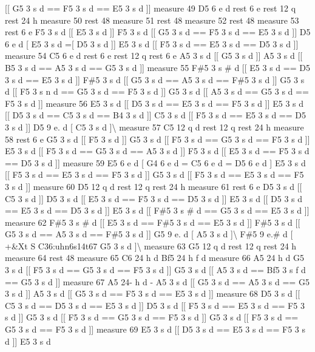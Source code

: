 \mbox{[}\mbox{[} G5 3 s d == F5 3 s d == E5 3 s d \mbox{]}\mbox{]} measure 49 D5 6 e d rest 6 e rest 12 q rest 24 h measure 50 rest 48 measure 51 rest 48 measure 52 rest 48 measure 53 rest 6 e F5 3 s d \mbox{[}\mbox{[} E5 3 s d \mbox{]}\mbox{]} F5 3 s d \mbox{[}\mbox{[} G5 3 s d == F5 3 s d == E5 3 s d \mbox{]}\mbox{]} D5 6 e d \mbox{[} E5 3 s d =\mbox{[} D5 3 s d \mbox{]}\mbox{]} E5 3 s d \mbox{[}\mbox{[} F5 3 s d == E5 3 s d == D5 3 s d \mbox{]}\mbox{]} measure 54 C5 6 e d rest 6 e rest 12 q rest 6 e A5 3 s d \mbox{[}\mbox{[} G5 3 s d \mbox{]}\mbox{]} A5 3 s d \mbox{[}\mbox{[} B5 3 s d == A5 3 s d == G5 3 s d \mbox{]}\mbox{]} measure 55 F\#5 3 s \# d \mbox{[}\mbox{[} E5 3 s d == D5 3 s d == E5 3 s d \mbox{]}\mbox{]} F\#5 3 s d \mbox{[}\mbox{[} G5 3 s d == A5 3 s d == F\#5 3 s d \mbox{]}\mbox{]} G5 3 s d \mbox{[}\mbox{[} F5 3 s n d == G5 3 s d == F5 3 s d \mbox{]}\mbox{]} G5 3 s d \mbox{[}\mbox{[} A5 3 s d == G5 3 s d == F5 3 s d \mbox{]}\mbox{]} measure 56 E5 3 s d \mbox{[}\mbox{[} D5 3 s d == E5 3 s d == F5 3 s d \mbox{]}\mbox{]} E5 3 s d \mbox{[}\mbox{[} D5 3 s d == C5 3 s d == B4 3 s d \mbox{]}\mbox{]} C5 3 s d \mbox{[}\mbox{[} F5 3 s d == E5 3 s d == D5 3 s d \mbox{]}\mbox{]} D5 9 e. d \mbox{[} C5 3 s d \mbox{]}\textbackslash{} measure 57 C5 12 q d rest 12 q rest 24 h measure 58 rest 6 e G5 3 s d \mbox{[}\mbox{[} F5 3 s d \mbox{]}\mbox{]} G5 3 s d \mbox{[}\mbox{[} F5 3 s d == G5 3 s d == F5 3 s d \mbox{]}\mbox{]} E5 3 s d \mbox{[}\mbox{[} F5 3 s d == G5 3 s d == A5 3 s d \mbox{]}\mbox{]} F5 3 s d \mbox{[}\mbox{[} E5 3 s d == F5 3 s d == D5 3 s d \mbox{]}\mbox{]} measure 59 E5 6 e d \mbox{[} G4 6 e d = C5 6 e d = D5 6 e d \mbox{]} E5 3 s d \mbox{[}\mbox{[} F5 3 s d == E5 3 s d == F5 3 s d \mbox{]}\mbox{]} G5 3 s d \mbox{[}\mbox{[} F5 3 s d == E5 3 s d == F5 3 s d \mbox{]}\mbox{]} measure 60 D5 12 q d rest 12 q rest 24 h measure 61 rest 6 e D5 3 s d \mbox{[}\mbox{[} C5 3 s d \mbox{]}\mbox{]} D5 3 s d \mbox{[}\mbox{[} E5 3 s d == F5 3 s d == D5 3 s d \mbox{]}\mbox{]} E5 3 s d \mbox{[}\mbox{[} D5 3 s d == E5 3 s d == D5 3 s d \mbox{]}\mbox{]} E5 3 s d \mbox{[}\mbox{[} F\#5 3 s \# d == G5 3 s d == E5 3 s d \mbox{]}\mbox{]} measure 62 F\#5 3 s \# d \mbox{[}\mbox{[} E5 3 s d == F\#5 3 s d == E5 3 s d \mbox{]}\mbox{]} F\#5 3 s d \mbox{[}\mbox{[} G5 3 s d == A5 3 s d == F\#5 3 s d \mbox{]}\mbox{]} G5 9 e. d \mbox{[} A5 3 s d \mbox{]}\textbackslash{} F\#5 9 e.\# d \mbox{[} +\&Xt S C36\+:uhn6s14t67 G5 3 s d \mbox{]}\textbackslash{} measure 63 G5 12 q d rest 12 q rest 24 h measure 64 rest 48 measure 65 C6 24 h d Bf5 24 h f d measure 66 A5 24 h d G5 3 s d \mbox{[}\mbox{[} F5 3 s d == G5 3 s d == F5 3 s d \mbox{]}\mbox{]} G5 3 s d \mbox{[}\mbox{[} A5 3 s d == Bf5 3 s f d == G5 3 s d \mbox{]}\mbox{]} measure 67 A5 24-\/ h d -\/ A5 3 s d \mbox{[}\mbox{[} G5 3 s d == A5 3 s d == G5 3 s d \mbox{]}\mbox{]} A5 3 s d \mbox{[}\mbox{[} G5 3 s d == F5 3 s d == E5 3 s d \mbox{]}\mbox{]} measure 68 D5 3 s d \mbox{[}\mbox{[} C5 3 s d == D5 3 s d == E5 3 s d \mbox{]}\mbox{]} D5 3 s d \mbox{[}\mbox{[} F5 3 s d == E5 3 s d == F5 3 s d \mbox{]}\mbox{]} G5 3 s d \mbox{[}\mbox{[} F5 3 s d == G5 3 s d == F5 3 s d \mbox{]}\mbox{]} G5 3 s d \mbox{[}\mbox{[} F5 3 s d == G5 3 s d == F5 3 s d \mbox{]}\mbox{]} measure 69 E5 3 s d \mbox{[}\mbox{[} D5 3 s d == E5 3 s d == F5 3 s d \mbox{]}\mbox{]} E5 3 s d 